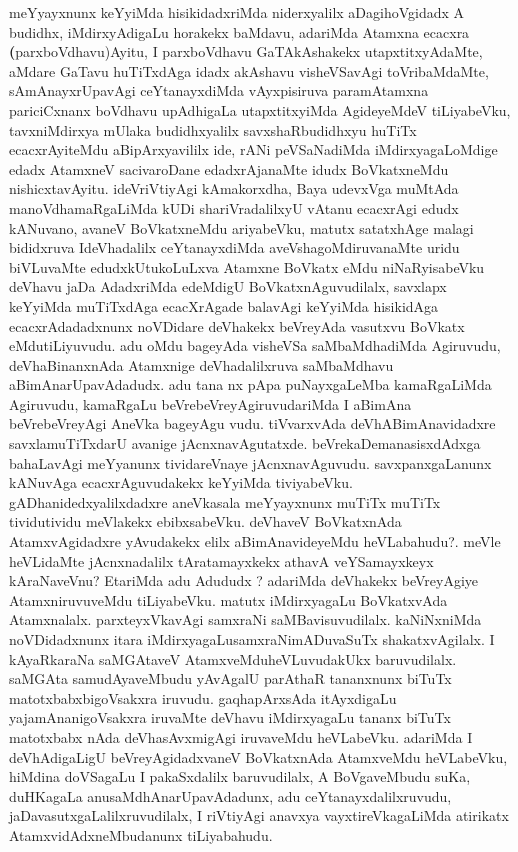 \begin{artha}
\-meYyayxnunx keYyiMda hisikidadxriMda niderxyalilx aDagihoVgidadx A
budidhx, iMdirxyAdigaLu \-horakekx baMdavu, adariMda Atamxna ecacxra
\textbf(parxboVdhavu)Ayitu, I parxboVdhavu GaTAkAshakekx
utapxtitxyAdaMte, aMdare GaTavu huTiTxdAga idadx akAshavu visheVSa\-vAgi
toVribaMdaMte, sAmAnayxrUpavAgi ceYtanayxdiMda vAyxpisiruva
paramAtamxna pariciCxnanx boVdhavu upAdhigaLa utapxtitxyiMda
AgideyeMdeV tiLiyabeVku, \break tavxniMdirxya mUlaka budidhxyalilx
savxshaRbudidhxyu huTiTx ecacxrAyiteMdu aBipArxya\-vililx ide, rANi
peVSaNadiMda iMdirxyagaLoMdige edadx AtamxneV sacivaroDane
edadxrAjanaMte idudx BoVkatxneMdu nishicxtavAyitu. ideVriVtiyAgi
kAmakorxdha, Baya udevxVga muMtAda manoVdhamaRgaLiMda kUDi
shariVradalilxyU  vAtanu ecacxrAgi edudx kANuvano, avaneV BoVkatxneMdu
ariyabeVku, matutx satatxhAge malagi bididxruva IdeVhadalilx
ceYtanayxdiMda aveVshagoMdiruvanaMte uridu biVLu\-vaMte
edudxkUtukoLuLxva Atamxne BoVkatx eMdu niNaRyisabeVku deVhavu
jaDa AdadxriMda edeMdigU BoVkatxnAguvudilalx, savxlapx keYyiMda
muTiTxdAga \-ecacXrAgade balavAgi keYyiMda hisikidAga ecacxrAdadadxnunx
noVDidare deVhakekx beVreyAda \-vasutxvu BoVkatx eMdutiLiyuvudu. adu
oMdu bageyAda visheVSa saMbaMdha\-diMda Agiruvudu, deVhaBinanxnAda
Atamxnige deVhadalilxruva saMbaMdhavu aBimAna\-rUpavAdadudx. adu tana
nx pApa puNayxgaLeMba kamaRgaLiMda Agiruvudu, kamaR\-gaLu
beVrebeVreyAgiruvudariMda I aBimAna beVrebeVreyAgi AneVka
bageyAgu\-	vudu. tiVvarxvAda deVhABimAnavidadxre savxlamuTiTxdarU avanige
jAcnxnavAgutatxde. beVrekaDemanasisxdAdxga bahaLavAgi meYyanunx
tividareVnaye jAcnxnavAguvudu. savxpanx\-gaLanunx kANuvAga
ecacxrAguvudakekx keYyiMda tiviyabeVku. gADhanidedxyalilxdadxre
aneVkasala meYyayxnunx muTiTx muTiTx tividutividu meVlakekx
ebibxsabeVku. deVhaveV BoVkatxnAda AtamxvAgidadxre yAvudakekx elilx
aBimAnavideyeMdu heVLabahudu?. meVle heVLidaMte jAcnxnadalilx
tAratamayxkekx athavA veYSamayxkeyx kAraNaveVnu? EtariMda adu Adududx
? adariMda deVhakekx beVreyAgiye AtamxniruvuveMdu tiLiyabeVku. matutx
iMdirxyagaLu BoVkatxvAda Atamxnalalx. parxteyxVkavAgi samxraNi
saMBavisu\-vudilalx. kaNiNxniMda noVDidadxnunx itara
iMdirxyagaLusamxraNimADuvaSuTx shakatxvAgilalx. I kAyaR\-karaNa
saMGAtaveV AtamxveMduheVLuvudakUkx baruvudilalx. saMGAta
samudAya\-veMbudu yAvAgalU parAthaR tananxnunx biTuTx
matotxbabxbigoVsakxra iruvudu. gaqhapArxsAda itAyxdigaLu
yajamAnanigoVsakxra iruvaMte deVhavu iMdirxyagaLu tananx biTuTx
matotxbabx nAda deVhasAvxmigAgi iruvaveMdu heVLabeVku. adariMda I
deVhAdigaLigU beVreyAgidadxvaneV BoVkatxnAda AtamxveMdu heVLabeVku,
\-hiMdina doVSagaLu I pakaSxdalilx baruvudilalx, A BoVgaveMbudu suKa,
duHKagaLa anu\-saMdhAnarUpavAdadunx, adu ceYtanayxdalilxruvudu,
jaDavasutxgaLalilxruvudilalx, I \-riVtiyAgi anavxya vayxtireVkagaLiMda
atirikatx AtamxvidAdxneMbudanunx tiLiyabahudu.
\end{artha}


